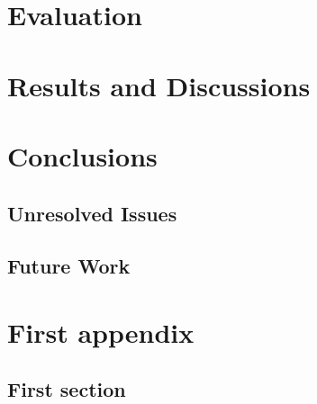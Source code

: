 \documentclass[logo,msc]{infthesis}           %
\begin{document}
\chapter{Evaluation}

\chapter{Results and Discussions}

\chapter{Conclusions}

\section{Unresolved Issues}

\section{Future Work}





\appendix

\chapter{First appendix}

\section{First section}
\end{document}
